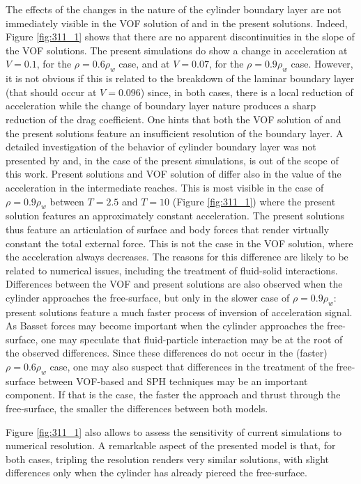The effects of the changes in the nature of the cylinder boundary layer are not immediately visible in the \ac{VOF} solution of \cite{Fekken-2004} and in the present solutions. Indeed, Figure \ref{fig:311_1} shows that there are no apparent discontinuities in the slope of the \ac{VOF} solutions. The present simulations do show a change in acceleration at $V=0.1$, for the $\rho=0.6\rho_{w}$ case, and at $V=0.07$, for the $\rho=0.9\rho_{w}$ case. However, it is not obvious if this is related to the breakdown of the laminar boundary layer (that should occur at $V=0.096$) since, in both cases, there is a local reduction of acceleration while the change of boundary layer nature produces a sharp reduction of the drag coefficient. One hints that both the \ac{VOF} solution of \cite{Fekken-2004} and the present solutions feature an insufficient resolution of the boundary layer. A detailed investigation of the behavior of cylinder boundary layer was not presented by \cite{Fekken-2004} and, in the case of the present simulations, is out of the scope of this work. Present solutions and \ac{VOF} solution of \cite{Fekken-2004} differ also in the value of the acceleration in the intermediate reaches. This is most visible in the case of $\rho=0.9\rho_{w}$ between $T=2.5$ and $T=10$ (Figure \ref{fig:311_1}) where the present solution features an approximately constant acceleration. The present solutions thus feature an articulation of surface and body forces that render virtually constant the total external force. This is not the case in the \ac{VOF} solution, where the acceleration always decreases. The reasons for this difference are likely to be related to numerical issues, including the treatment of fluid-solid interactions. Differences between the \ac{VOF} and present solutions are also observed when the cylinder approaches the free-surface, but only in the slower case of $\rho=0.9\rho_{w}$: present solutions feature a much faster process of inversion of acceleration signal. As Basset forces may become important when the cylinder approaches the free-surface, one may speculate that fluid-particle interaction may be at the root of the observed differences. Since these differences do not occur in the (faster) $\rho=0.6\rho_{w}$ case, one may also suspect that differences in the treatment of the free-surface between \ac{VOF}-based and \ac{SPH} techniques may be an important component. If that is the case, the faster the approach and thrust through the free-surface, the smaller the differences between both models.

Figure \ref{fig:311_1} also allows to assess the sensitivity of current simulations to numerical resolution. A remarkable aspect of the presented model is that, for both cases, tripling the resolution renders very similar solutions, with slight differences only when the cylinder has already pierced the free-surface. 

